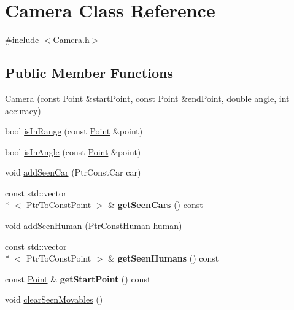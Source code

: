 \hypertarget{classCamera}{\section{Camera Class Reference}
\label{classCamera}
}


{\ttfamily \#include $<$Camera.\-h$>$}

\subsection*{Public Member Functions}
\begin{DoxyCompactItemize}
\item 
\hyperlink{classCamera_abe130756ff92b7d9a49eac7a7cbcdbf0}{Camera} (const \hyperlink{classPoint}{Point} \&start\-Point, const \hyperlink{classPoint}{Point} \&end\-Point, double angle, int accuracy)
\item 
bool \hyperlink{classCamera_aca2c02d0712f8e4348ccf1cabac7d582}{is\-In\-Range} (const \hyperlink{classPoint}{Point} \&point)
\item 
bool \hyperlink{classCamera_a8a061df42fe0c6307fbc82e49d85fdff}{is\-In\-Angle} (const \hyperlink{classPoint}{Point} \&point)
\item 
void \hyperlink{classCamera_ac1ec1097de9c1e28283e25b4ca65a2ad}{add\-Seen\-Car} (Ptr\-Const\-Car car)
\item 
\hypertarget{classCamera_a45075ec37bddba6d49c1b38b048ca0ef}{const std\-::vector\\*
$<$ Ptr\-To\-Const\-Point $>$ \& {\bfseries get\-Seen\-Cars} () const }\label{classCamera_a45075ec37bddba6d49c1b38b048ca0ef}

\item 
void \hyperlink{classCamera_a64ea66b871f4dc6408e759f26a4c5267}{add\-Seen\-Human} (Ptr\-Const\-Human human)
\item 
\hypertarget{classCamera_afb7072d894f391afc99595d3590e390d}{const std\-::vector\\*
$<$ Ptr\-To\-Const\-Point $>$ \& {\bfseries get\-Seen\-Humans} () const }\label{classCamera_afb7072d894f391afc99595d3590e390d}

\item 
\hypertarget{classCamera_a174cb7954685f7230bedc91b45d3abc6}{const \hyperlink{classPoint}{Point} \& {\bfseries get\-Start\-Point} () const }\label{classCamera_a174cb7954685f7230bedc91b45d3abc6}

\item 
void \hyperlink{classCamera_ad42a7ec70d41ae24b3ee9d3cd5fad837}{clear\-Seen\-Movables} ()
\end{DoxyCompactItemize}


